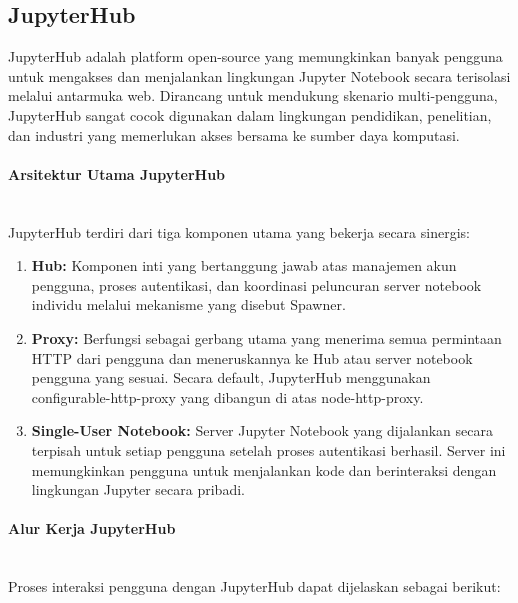 \subsection{JupyterHub}

JupyterHub adalah platform open-source yang memungkinkan banyak pengguna untuk mengakses dan menjalankan lingkungan Jupyter Notebook secara terisolasi melalui antarmuka web. Dirancang untuk mendukung skenario multi-pengguna, JupyterHub sangat cocok digunakan dalam lingkungan pendidikan, penelitian, dan industri yang memerlukan akses bersama ke sumber daya komputasi.

\paragraph{Arsitektur Utama JupyterHub}\mbox{}\\
JupyterHub terdiri dari tiga komponen utama yang bekerja secara sinergis:


\begin{enumerate}
\item \textbf{Hub:} Komponen inti yang bertanggung jawab atas manajemen akun pengguna, proses autentikasi, dan koordinasi peluncuran server notebook individu melalui mekanisme yang disebut Spawner.
\item \textbf{Proxy:} Berfungsi sebagai gerbang utama yang menerima semua permintaan HTTP dari pengguna dan meneruskannya ke Hub atau server notebook pengguna yang sesuai. Secara default, JupyterHub menggunakan configurable-http-proxy yang dibangun di atas node-http-proxy.
\item \textbf{Single-User Notebook:} Server Jupyter Notebook yang dijalankan secara terpisah untuk setiap pengguna setelah proses autentikasi berhasil. Server ini memungkinkan pengguna untuk menjalankan kode dan berinteraksi dengan lingkungan Jupyter secara pribadi.
\end{enumerate}

\paragraph{Alur Kerja JupyterHub}\mbox{}\\
Proses interaksi pengguna dengan JupyterHub dapat dijelaskan sebagai berikut:

